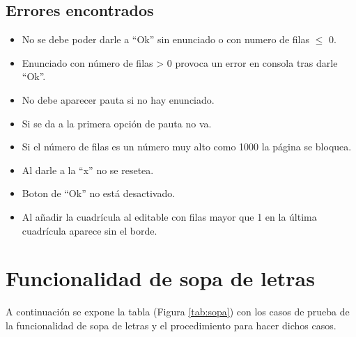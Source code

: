 \subsection{Errores encontrados}
\label{errores:desarrollo}
\begin{itemize}
    \item No se debe poder darle a ``Ok'' sin enunciado o con numero de filas $\leq$ 0.
    \item Enunciado con número de filas > 0 provoca un error en consola tras darle ``Ok''.
    \item No debe aparecer pauta si no hay enunciado.
    \item Si se da a la primera opción de pauta no va.
    \item Si el número de filas es un número muy alto como 1000 la página se bloquea.
    \item Al darle a la ``x'' no se resetea.
    \item Boton de ``Ok'' no está desactivado.
    \item  Al añadir la cuadrícula al editable con filas mayor que 1 en la última cuadrícula aparece sin el borde.
    
\end{itemize}

\section{Funcionalidad de sopa de letras}
\label{planPruebas:sopa}
A continuación se expone la tabla (Figura \ref{tab:sopa}) con los casos de prueba de la funcionalidad de sopa de letras y el procedimiento para hacer dichos casos.

